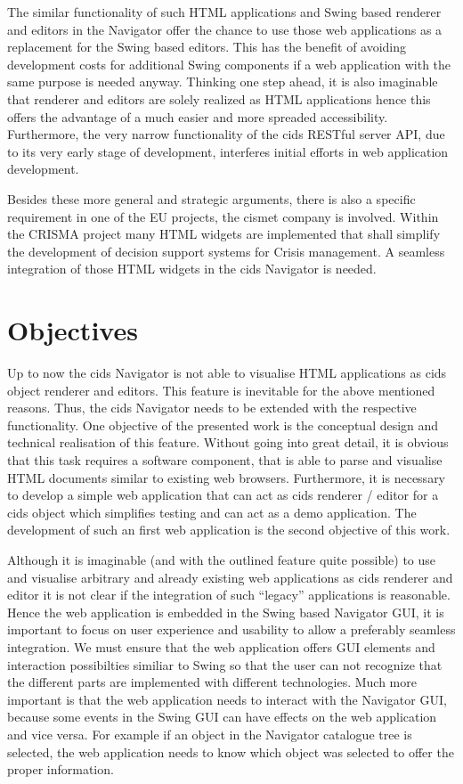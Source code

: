 The similar functionality of such HTML applications and Swing based renderer and editors in the Navigator offer the chance to use those web applications as a replacement for the Swing based editors.
This has the benefit of avoiding development costs for additional Swing components if a web application with the same purpose is needed anyway.
Thinking one step ahead, it is also imaginable that renderer and editors are solely realized as HTML applications hence this offers the advantage of a much easier and more spreaded accessibility. 
Furthermore, the very narrow functionality of the cids RESTful server API, due to its very early stage of development, interferes initial efforts in web application development.
 
Besides these more general and strategic arguments, there is also a specific requirement in one of the EU projects, the cismet company is involved.
Within the CRISMA project many HTML widgets are implemented that shall simplify the development of decision support systems for Crisis management.
A seamless integration of those HTML widgets in the cids Navigator is needed.

\section{Objectives}\label{chap:intro-objectives}

Up to now the cids Navigator is not able to visualise HTML applications as cids object renderer and editors.
This feature is inevitable for the above mentioned reasons.
Thus, the cids Navigator needs to be extended with the respective functionality.
One objective of the presented work is the conceptual design and technical realisation of this feature.
Without going into great detail, it is obvious that this task requires a software component, that is able to parse and visualise HTML documents similar to existing web browsers.
Furthermore, it is necessary to develop a simple web application that can act as cids renderer / editor for a cids object which simplifies testing and can act as a demo application.
The development of such an first web application is the second objective of this work.

Although it is imaginable (and with the outlined feature quite possible) to use and visualise arbitrary and already existing web applications as cids renderer and editor it is not clear if the integration of such \enquote{legacy} applications is reasonable.
Hence the web application is embedded in the Swing based Navigator GUI, it is important to focus on user experience and usability to allow a preferably seamless integration.
We must ensure that the web application offers GUI elements and interaction possibilties similiar to Swing so that the user can not recognize that the different parts are implemented with different technologies.
Much more important is that the web application needs to interact with the Navigator GUI, because some events in the Swing GUI can have effects on the web application and vice versa.
For example if an object in the Navigator catalogue tree is selected, the web application needs to know which object was selected to offer the proper information.

